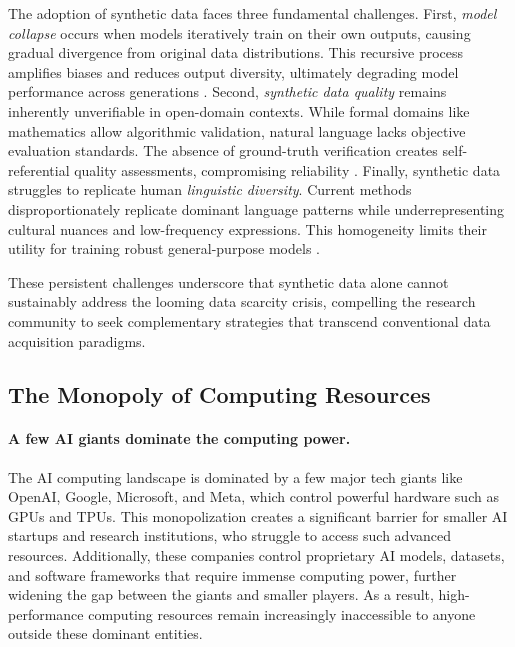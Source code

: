 The adoption of synthetic data faces three fundamental challenges. First, \textit{model collapse} occurs when models iteratively train on their own outputs, causing gradual divergence from original data distributions. This recursive process amplifies biases and reduces output diversity, ultimately degrading model performance across generations \cite{shumailov2023curse,dohmatob2024strong}. 
Second, \textit{synthetic data quality} remains inherently unverifiable in open-domain contexts. While formal domains like mathematics allow algorithmic validation, natural language lacks objective evaluation standards. The absence of ground-truth verification creates self-referential quality assessments, compromising reliability \cite{alemohammad2023self,wenger2024ai}.
Finally, synthetic data struggles to replicate human \textit{linguistic diversity}. Current methods disproportionately replicate dominant language patterns while underrepresenting cultural nuances and low-frequency expressions. This homogeneity limits their utility for training robust general-purpose models \cite{fan2024scaling}.

These persistent challenges underscore that synthetic data alone cannot sustainably address the looming data scarcity crisis, compelling the research community to seek complementary strategies that transcend conventional data acquisition paradigms.




\subsection{The Monopoly of Computing Resources}\label{subsec:compute_monopoly}
\paragraph{A few AI giants dominate the computing power.}
The AI computing landscape is dominated by a few major tech giants like OpenAI, Google, Microsoft, and Meta, which control powerful hardware such as GPUs and TPUs. This monopolization creates a significant barrier for smaller AI startups and research institutions, who struggle to access such advanced resources. Additionally, these companies control proprietary AI models, datasets, and software frameworks that require immense computing power, further widening the gap between the giants and smaller players. As a result, high-performance computing resources remain increasingly inaccessible to anyone outside these dominant entities.

